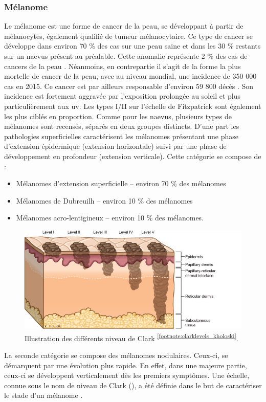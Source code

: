 \subsubsection{Mélanome}
Le mélanome est une forme de cancer de la peau, se développant à partir de mélanocytes, également qualifié de tumeur mélanocytaire. Ce type de cancer se développe dans environ 70 \% des cas sur une peau saine et dans les 30 \% restants sur un naevus présent au préalable. Cette anomalie représente 2 \% des cas de cancers de la peau \cite{TortoraG;Derrickson2012}. Néanmoins, en contrepartie il s’agit de la forme la plus mortelle de cancer de la peau, avec au niveau mondial, une incidence de 350 000 cas en 2015. Ce cancer est par ailleurs responsable d’environ 59 800 décès \cite{Karimkhani2017}. Son incidence est fortement aggravée par l’exposition prolongée au soleil et plus particulièrement aux \gls{uv}. Les types I/II sur l’échelle de Fitzpatrick sont également les plus ciblés en proportion.
Comme pour les naevus, plusieurs types de mélanomes sont recensés, séparés en deux groupes distincts. D’une part les pathologies superficielles caractérisent les mélanomes présentant une phase d’extension épidermique (extension horizontale) suivi par une phase de développement en profondeur (extension verticale). Cette catégorie se compose de :
\begin{itemize}
\item Mélanomes d'extension superficielle – environ 70 \% des mélanomes
\item Mélanomes de Dubreuilh – environ 10 \% des mélanomes \cite{LeGal2011}
\item Mélanomes acro-lentigineux – environ 10 \% des mélanomes.
\end{itemize}
\begin{figure}[H]
    \centering
    \includegraphics[width=0.7\linewidth]{contents/chapter_1/resources/clarklevels_kholoski.png}
    \caption{Illustration des différents niveau de Clark \cite{Clark1969} \textsuperscript{\ref{footnote:clarklevels_kholoski}}.}
    \label{fig:clarklevels_kholoski}
\end{figure}\par
\addtocounter{footnote}{1}
La seconde catégorie se compose des mélanomes nodulaires. Ceux-ci, se démarquent par une évolution plus rapide. En effet, dans une majeure partie, ceux-ci se développent verticalement dès les premiers symptômes. Une échelle, connue sous le nom de niveau de Clark (), a été définie dans le but de caractériser le stade d’un mélanome \cite{Clark1969}.\par

